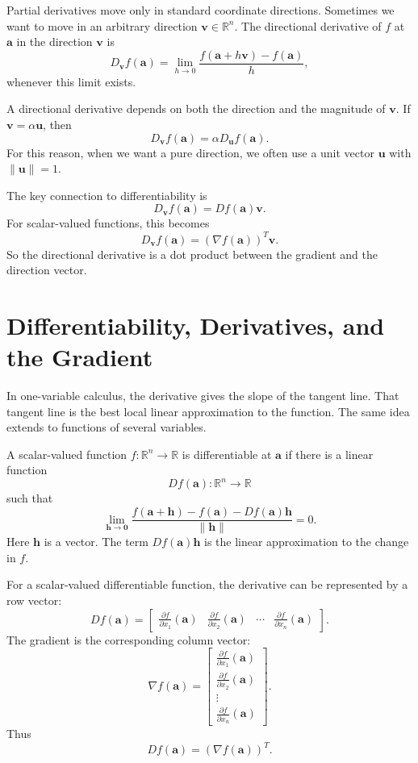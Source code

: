 Partial derivatives move only in standard coordinate directions. Sometimes we want to move in an arbitrary direction \(\mathbf{v}\in\mathbb{R}^n\). The directional derivative of \(f\) at \(\mathbf{a}\) in the direction \(\mathbf{v}\) is
\[
    D_{\mathbf{v}}f(\mathbf{a})
    =\lim_{h\to 0}\frac{f(\mathbf{a}+h\mathbf{v})-f(\mathbf{a})}{h},
\]
whenever this limit exists.

A directional derivative depends on both the direction and the magnitude of \(\mathbf{v}\). If \(\mathbf{v}=\alpha\mathbf{u}\), then
\[
    D_{\mathbf{v}}f(\mathbf{a})=\alpha D_{\mathbf{u}}f(\mathbf{a}).
\]
For this reason, when we want a pure direction, we often use a unit vector \(\mathbf{u}\) with \(\|\mathbf{u}\|=1\).

The key connection to differentiability is
\[
    D_{\mathbf{v}}f(\mathbf{a})=Df(\mathbf{a})\mathbf{v}.
\]
For scalar-valued functions, this becomes
\[
    D_{\mathbf{v}}f(\mathbf{a})=(\nabla f(\mathbf{a}))^T\mathbf{v}.
\]
So the directional derivative is a dot product between the gradient and the direction vector.

\section{Differentiability, Derivatives, and the Gradient}
\label{mf:gradient}

In one-variable calculus, the derivative gives the slope of the tangent line. That tangent line is the best local linear approximation to the function. The same idea extends to functions of several variables.

A scalar-valued function \(f:\mathbb{R}^n\to\mathbb{R}\) is differentiable at \(\mathbf{a}\) if there is a linear function
\[
    Df(\mathbf{a}):\mathbb{R}^n\to\mathbb{R}
\]
such that
\[
    \lim_{\mathbf{h}\to\mathbf{0}}
    \frac{f(\mathbf{a}+\mathbf{h})-f(\mathbf{a})-Df(\mathbf{a})\mathbf{h}}
    {\|\mathbf{h}\|}=0.
\]
Here \(\mathbf{h}\) is a vector. The term \(Df(\mathbf{a})\mathbf{h}\) is the linear approximation to the change in \(f\).

For a scalar-valued differentiable function, the derivative can be represented by a row vector:
\[
    Df(\mathbf{a})=\begin{bmatrix}
        \frac{\partial f}{\partial x_1}(\mathbf{a}) &
        \frac{\partial f}{\partial x_2}(\mathbf{a}) &
        \cdots &
        \frac{\partial f}{\partial x_n}(\mathbf{a})
    \end{bmatrix}.
\]
The gradient is the corresponding column vector:
\[
    \nabla f(\mathbf{a})=\begin{bmatrix}
        \frac{\partial f}{\partial x_1}(\mathbf{a})\\
        \frac{\partial f}{\partial x_2}(\mathbf{a})\\
        \vdots\\
        \frac{\partial f}{\partial x_n}(\mathbf{a})
    \end{bmatrix}.
\]
Thus
\[
    Df(\mathbf{a})=(\nabla f(\mathbf{a}))^T.
\]

